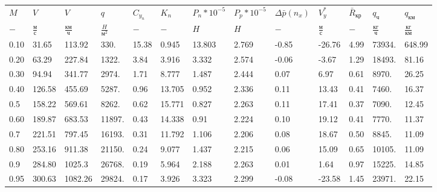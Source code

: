 \begin{tabular}{lllllllllllll}
$M$ & $V$ & $V$ & $q$ & $C_{y_n}$ & $K_n$ & $P_n*10^{-5}$ & $P_p*10^{-5}$ & $\Delta \bar{p}(n_x)$ & $V_y^*$ & $\bar{R}_{кр}$ & $q_{ч}$ & $q_{км}$ \\
$-$ & $\frac{м}{с}$ & $\frac{км}{ч}$ & $\frac{H}{м^2}$ & $-$ & $-$ & $H$ & $H$ & $-$ & $\frac{м}{с}$ & $-$ & $\frac{кг}{ч}$ & $\frac{кг}{км}$ \\
0.10 & 31.65 & 113.92 & 330. & 15.38 & 0.945 & 13.803 & 2.769 & -0.85 & -26.76 & 4.99 & 73934. & 648.99 \\
0.20 & 63.29 & 227.84 & 1322. & 3.84 & 3.916 & 3.332 & 2.574 & -0.06 & -3.67 & 1.29 & 18493. & 81.16 \\
0.30 & 94.94 & 341.77 & 2974. & 1.71 & 8.777 & 1.487 & 2.444 & 0.07 & 6.97 & 0.61 & 8970. & 26.25 \\
0.40 & 126.58 & 455.69 & 5287. & 0.96 & 13.705 & 0.952 & 2.336 & 0.11 & 13.43 & 0.41 & 7460. & 16.37 \\
0.5 & 158.22 & 569.61 & 8262. & 0.62 & 15.771 & 0.827 & 2.263 & 0.11 & 17.41 & 0.37 & 7090. & 12.45 \\
0.60 & 189.87 & 683.53 & 11897. & 0.43 & 14.338 & 0.91 & 2.224 & 0.10 & 19.12 & 0.41 & 7770. & 11.37 \\
0.7 & 221.51 & 797.45 & 16193. & 0.31 & 11.792 & 1.106 & 2.206 & 0.08 & 18.67 & 0.50 & 8845. & 11.09 \\
0.80 & 253.16 & 911.38 & 21150. & 0.24 & 9.077 & 1.437 & 2.215 & 0.06 & 15.09 & 0.65 & 10105. & 11.09 \\
0.9 & 284.80 & 1025.3 & 26768. & 0.19 & 5.964 & 2.188 & 2.263 & 0.01 & 1.64 & 0.97 & 15225. & 14.85 \\
0.95 & 300.63 & 1082.26 & 29824. & 0.17 & 3.926 & 3.323 & 2.299 & -0.08 & -23.58 & 1.45 & 23971. & 22.15 \\
\end{tabular}
